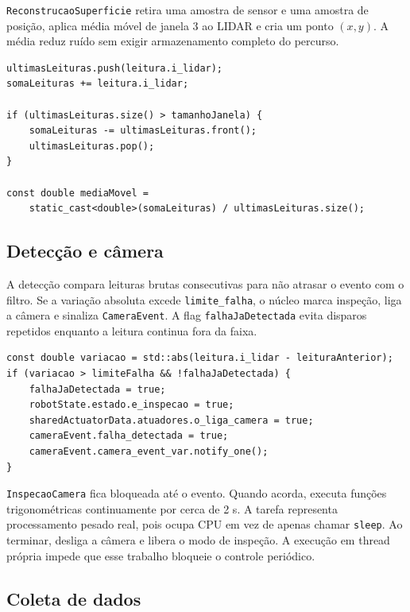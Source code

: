 \documentclass[12pt,a4paper]{article}
\begin{document}
\texttt{ReconstrucaoSuperficie} retira uma amostra de sensor e uma amostra de posição, aplica média móvel de janela 3 ao LIDAR e cria um ponto $(x,y)$. A média reduz ruído sem exigir armazenamento completo do percurso.

\begin{lstlisting}[style=cppstyle,caption={Média móvel de três leituras.}]
ultimasLeituras.push(leitura.i_lidar);
somaLeituras += leitura.i_lidar;

if (ultimasLeituras.size() > tamanhoJanela) {
    somaLeituras -= ultimasLeituras.front();
    ultimasLeituras.pop();
}

const double mediaMovel =
    static_cast<double>(somaLeituras) / ultimasLeituras.size();
\end{lstlisting}

\subsection{Detecção e câmera}

A detecção compara leituras brutas consecutivas para não atrasar o evento com o filtro. Se a variação absoluta excede \texttt{limite\_falha}, o núcleo marca inspeção, liga a câmera e sinaliza \texttt{CameraEvent}. A flag \texttt{falhaJaDetectada} evita disparos repetidos enquanto a leitura continua fora da faixa.

\begin{lstlisting}[style=cppstyle,caption={Sinalização de falha.}]
const double variacao = std::abs(leitura.i_lidar - leituraAnterior);
if (variacao > limiteFalha && !falhaJaDetectada) {
    falhaJaDetectada = true;
    robotState.estado.e_inspecao = true;
    sharedActuatorData.atuadores.o_liga_camera = true;
    cameraEvent.falha_detectada = true;
    cameraEvent.camera_event_var.notify_one();
}
\end{lstlisting}

\texttt{InspecaoCamera} fica bloqueada até o evento. Quando acorda, executa funções trigonométricas continuamente por cerca de 2 s. A tarefa representa processamento pesado real, pois ocupa CPU em vez de apenas chamar \texttt{sleep}. Ao terminar, desliga a câmera e libera o modo de inspeção. A execução em thread própria impede que esse trabalho bloqueie o controle periódico.

\subsection{Coleta de dados}
\end{document}

